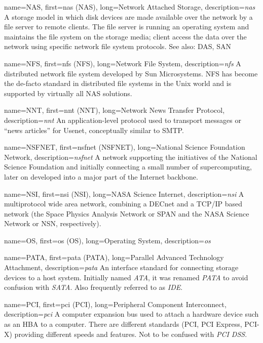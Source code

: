 {
	name={NAS},
	first={\acrlong{nas} (NAS)},
	long={Network Attached Storage},
	description={{\em \acrlong{nas}} A storage model in which disk
devices are made available over the network by a file server to remote
clients.  The file server is running an operating system and maintains the
file system on the storage media; client access the data over the network
using specific network file system protocols.  See
also: DAS, SAN}
}

{
	name={NFS},
	first={\acrlong{nfs} (NFS)},
	long={Network File System},
	description={{\em \acrlong{nfs}} A distributed network file system
developed by Sun Microsystems.  NFS has become the de-facto standard in
distributed file systems in the Unix world and is supported by virtually
all NAS solutions.}
}

{
	name={NNT},
	first={\acrlong{nnt} (NNT)},
	long={Network News Transfer Protocol},
	description={{\em \acrlong{nnt}} An application-level
protocol used to transport messages or ``news articles'' for Usenet,
conceptually similar to SMTP.}
}

{
	name={NSFNET},
	first={\acrlong{nsfnet} (NSFNET)},
	long={National Science Foundation Network},
	description={{\em \acrlong{nsfnet}} A network
supporting the initiatives of the National Science Foundation and
initially connecting a small number of supercomputing, later on developed
into a major part of the Internet backbone.}
}

{
	name={NSI},
	first={\acrlong{nsi} (NSI)},
	long={NASA Science Internet},
	description={{\em \acrlong{nsi}} A multiprotocol wide area network,
combining a DECnet and a TCP/IP based network (the Space Physics Analysis
Network or SPAN and the NASA Science Network or NSN,
respectively).}
}

{
	name={OS},
	first={\acrlong{os} (OS)},
	long={Operating System},
	description={{\em \acrlong{os}} \empty}
}

{
	name={PATA},
	first={\acrlong{pata} (PATA)},
	long={Parallel Advanced Technology Attachment},
	description={{\em \acrlong{pata}} An interface
standard for connecting storage devices to a host system.  Initially named
{\em ATA}, it was renamed {\em PATA} to avoid confusion with {\em SATA}.
Also frequently referred to as {\em IDE}.}
}

{
	name={PCI},
	first={\acrlong{pci} (PCI)},
	long={Peripheral Component Interconnect},
	description={{\em \acrlong{pci}} A computer expansion bus
used to attach a hardware device such as an HBA to a computer.  There are
different standards (PCI, PCI Express, PCI-X) providing different speeds
and features. Not to be confused with {\em PCI DSS}.}
}

